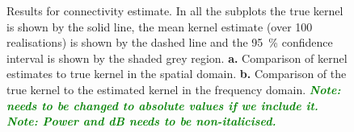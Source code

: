 \documentclass[twocolumn,11pt,a4paper]{article}		%
\newcommand{\dean}[1]{\textsf{\emph{\textbf{\textcolor{green}{#1}}}}}
\begin{document}
\begin{figure}
\caption{Results for connectivity estimate. In all the subplots the true kernel is shown by the solid line, the mean kernel estimate (over 100 realisations) is shown by the dashed line and the 95~\% confidence interval is shown by the shaded grey region. \textbf{a.} Comparison of kernel estimates to true kernel in the spatial domain. \textbf{b.} Comparison of the true kernel to the estimated kernel in the frequency domain. \dean{Note: needs to be changed to absolute values if we include it.} \dean{Note: Power and dB needs to be non-italicised.}}
\label{fig:KernelEstimates}
\end{figure}
\end{document}
